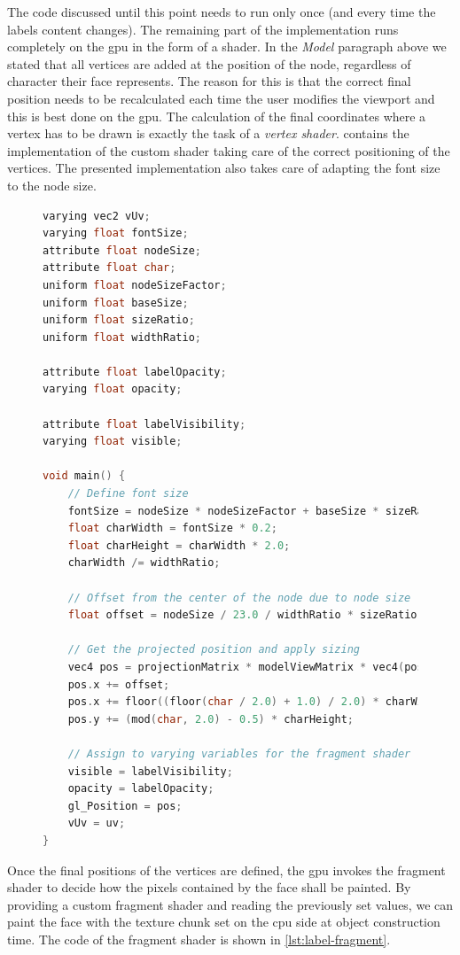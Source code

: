 The code discussed until this point needs to run only once (and every time the labels content changes). The remaining part of the implementation runs completely on the \gls{gpu} in the form of a shader. In the \emph{Model} paragraph above we stated that all vertices are added at the position of the node, regardless of character their face represents. The reason for this is that the correct final position needs to be recalculated each time the user modifies the viewport and this is best done on the \gls{gpu}. The calculation of the final coordinates where a vertex has to be drawn is exactly the task of a \emph{vertex shader}.  contains the implementation of the custom shader taking care of the correct positioning of the vertices. The presented implementation also takes care of adapting the font size to the node size.

\begin{figure}
\begin{lstlisting}[caption={Vertex shader for the final positioning of the label vertices (GLSL).},label=lst:label-vertex,language=c]
varying vec2 vUv;
varying float fontSize;
attribute float nodeSize;
attribute float char;
uniform float nodeSizeFactor;
uniform float baseSize;
uniform float sizeRatio;
uniform float widthRatio;

attribute float labelOpacity;
varying float opacity;

attribute float labelVisibility;
varying float visible;

void main() {
    // Define font size
    fontSize = nodeSize * nodeSizeFactor + baseSize * sizeRatio / 10.0;
    float charWidth = fontSize * 0.2;
    float charHeight = charWidth * 2.0;
    charWidth /= widthRatio;

    // Offset from the center of the node due to node size
    float offset = nodeSize / 23.0 / widthRatio * sizeRatio;

    // Get the projected position and apply sizing
    vec4 pos = projectionMatrix * modelViewMatrix * vec4(position, 1.0);
    pos.x += offset;
    pos.x += floor((floor(char / 2.0) + 1.0) / 2.0) * charWidth;
    pos.y += (mod(char, 2.0) - 0.5) * charHeight;

    // Assign to varying variables for the fragment shader
    visible = labelVisibility;
    opacity = labelOpacity;
    gl_Position = pos;
    vUv = uv;
}
\end{lstlisting}
\end{figure}

Once the final positions of the vertices are defined, the \gls{gpu} invokes the fragment shader to decide how the pixels contained by the face shall be painted. By providing a custom fragment shader and reading the previously set values, we can paint the face with the texture chunk set on the \gls{cpu} side at object construction time. The code of the fragment shader is shown in \vref{lst:label-fragment}.

